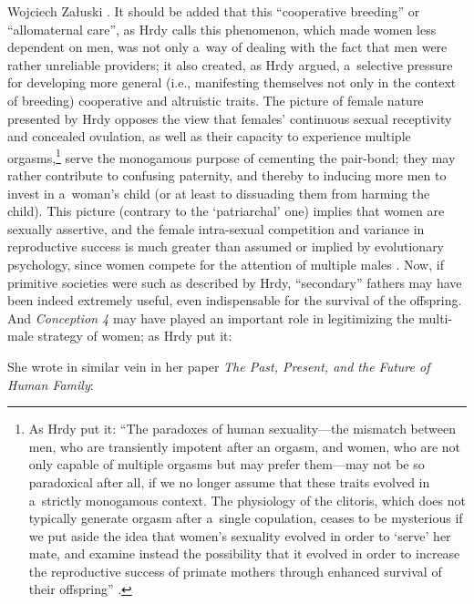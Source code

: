 \begin{artengenv}{Wojciech Załuski}
\parencite[][p.101]{hrdy_past_2001}. %
 It should be added that this ``cooperative breeding'' or ``allomaternal care'', as Hrdy calls this phenomenon, which made women less dependent on men, was not only a~way of dealing with the fact that men were rather unreliable providers; it also created, as Hrdy 
\parencite*[][]{hrdy_mothers_2009} %
 argued, a~selective pressure for developing more general (i.e., manifesting themselves not only in the context of breeding) cooperative and altruistic traits. The picture of female nature presented by Hrdy opposes the view that females' continuous sexual receptivity and concealed ovulation, as well as their capacity to experience multiple orgasms,\footnote{As Hrdy put it: ``The paradoxes of human sexuality---the mismatch between men, who are transiently impotent after an orgasm, and women, who are not only capable of multiple orgasms but may prefer them---may not be so paradoxical after all, if we no longer assume that these traits evolved in a~strictly monogamous context. The physiology of the clitoris, which does not typically generate orgasm after a~single copulation, ceases to be mysterious if we put aside the idea that women's sexuality evolved in order to ‘serve' her mate, and examine instead the possibility that it evolved in order to increase the reproductive success of primate mothers through enhanced survival of their offspring'' 
\parencite[][p.176]{hrdy_woman_1999}.%
} serve the monogamous purpose of cementing the pair-bond; they may rather contribute to confusing paternity, and thereby to inducing more men to invest in a~woman's child (or at least to dissuading them from harming the child). This picture (contrary to the ‘patriarchal' one) implies that women are sexually assertive, and the female intra-sexual competition and variance in reproductive success is much greater than assumed or implied by evolutionary psychology, since women compete for the attention of multiple males 
\parencite[cf.][p.132]{hrdy_woman_1999}. %
 Now, if primitive societies were such as described by Hrdy, ``secondary'' fathers may have been indeed extremely useful, even indispensable for the survival of the offspring. And \textit{Conception 4} may have played an important role in legitimizing the multi-male strategy of women; as Hrdy put it:

She wrote in similar vein in her paper \textit{The Past, Present, and the Future of Human Family}:


\end{artengenv}
